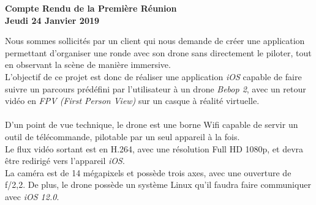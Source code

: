 \documentclass[]{article}
\begin{document}
\pagestyle{fancy}
\renewcommand\headrulewidth{1pt}
\renewcommand\footrulewidth{1pt}

\begin{center}
\textbf{Compte Rendu de la Première Réunion \\ Jeudi 24 Janvier 2019 \bigbreak}
\end{center}
	Nous sommes sollicités par un client qui nous demande de créer une application permettant d'organiser une ronde avec son drone sans directement le piloter, tout en observant la scène de manière immersive. \\
L'objectif de ce projet est donc de réaliser une application \textit{iOS} capable de faire suivre un parcours prédéfini par l'utilisateur à un drone \textit{Bebop 2}, avec un retour vidéo en \textit{FPV (First Person View)} sur un casque à réalité virtuelle. \\ \\

D'un point de vue technique, le drone est une borne Wifi capable de servir un outil de télécommande, pilotable par un seul appareil à la fois. \\
Le flux vidéo sortant est en H.264, avec une résolution Full HD 1080p, et devra être redirigé vers l'appareil \textit{iOS}.
\\La caméra est de 14 mégapixels et possède trois axes, avec  une ouverture de f/2,2.
De plus, le drone possède un système Linux qu'il faudra faire communiquer avec \textit{iOS 12.0}.\\ 
\\
\end{document}
